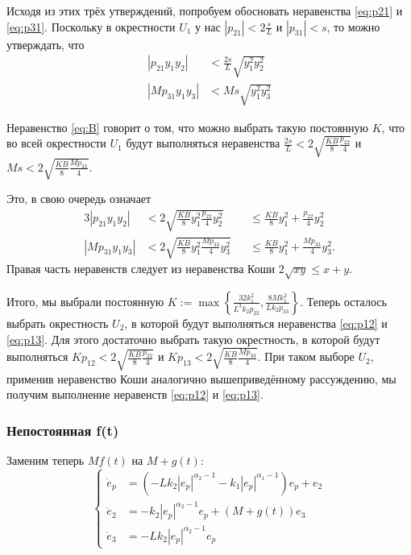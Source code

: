 \documentclass{article}
\begin{document}
Исходя из этих трёх утверждений, попробуем обосновать неравенства \eqref{eq:p21} и \eqref{eq:p31}.
Поскольку в окрестности $U_1$ у нас  $|p_{21}|<2\frac{s}{L}$ и $|p_{31}|<s$, то можно утверждать, что
\begin{align*}
|p_{21}y_1 y_2| & < \frac{2s}{L} \sqrt{y_1^2 y_2^2}\\
|Mp_{31}y_1 y_3| & < Ms \sqrt{y_1^2 y_3^2}
\end{align*}


Неравенство \eqref{eq:B} говорит о том, что можно выбрать такую постоянную $K$, что во всей окрестности $U_1$ будут выполняться неравенства
$\frac{2s}{L} < 2 \sqrt{\frac{KB}{8}\frac{p_{22}}{4}}$ и $Ms < 2 \sqrt{\frac{KB}{8}\frac{Mp_{33}}{4}}$.

Это, в свою очередь означает
\begin{alignat*}{3}
|p_{21}y_1 y_2| & < 2 \sqrt{\frac{KB}{8} y_1^2 \frac{p_{22}}{4}y_2^2} && \leq \frac{KB}{8}y_1^2 + \frac{p_{22}}{4}y_2^2 \\
|Mp_{31}y_1 y_3| & < 2 \sqrt{\frac{KB}{8} y_1^2 \frac{M p_{33}}{4}y_3^2} && \leq \frac{KB}{8}y_1^2 + \frac{Mp_{33}}{4} y_3^2.
\end{alignat*}
Правая часть неравенств следует из неравенства Коши $2\sqrt{xy} \leq x+y$.

Итого, мы выбрали постоянную $K:=\max\left\{\frac{32k_1^2}{L^3k_2p_{22}}, \frac{8Mk_1^2}{Lk_2p_{33}}\right\}$. 
Теперь осталось выбрать окрестность $U_2$, в которой будут выполняться неравенства \eqref{eq:p12} и \eqref{eq:p13}.
Для этого достаточно выбрать такую окрестность, в которой будут выполняться
$Kp_{12} < 2 \sqrt{\frac{KB}{8}\frac{p_{22}}{4}}$ и $Kp_{13} < 2 \sqrt{\frac{KB}{8}\frac{Mp_{33}}{4}}$.
При таком выборе $U_2$, применив неравенство Коши аналогично вышеприведённому рассуждению, мы получим выполнение неравенств \eqref{eq:p12} и \eqref{eq:p13}.

\subsubsection{Непостоянная f(t)}
Заменим теперь $Mf(t)$ на $M+g(t)$:
\begin{equation}
\label{eq:errdynfneq1}
\left\{
\begin{aligned}
\dot e_p&=(-Lk_2|e_p|^{\alpha_2-1}-k_1|e_p|^{\alpha_1-1})e_p+e_2  \\
\dot e_2&= - k_2|e_p|^{\alpha_2-1}e_p+(M+g(t))e_3\\
\dot e_3&=  -Lk_2|e_p|^{\alpha_2-1}e_p
\end{aligned}
\right.
\end{equation}
\end{document}
